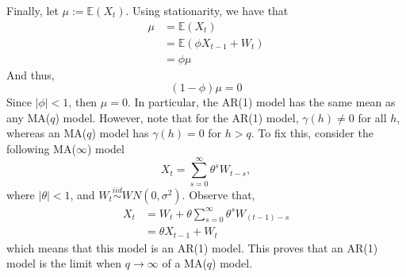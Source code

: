 \documentclass[11pt, english]{article}
\begin{document}
\begin{multicols}{2}
Finally, let $\mu := \mathbb{E}(X_{t})$. Using stationarity, we have that
	\begin{align*}
		\mu	&=	\mathbb{E}(X_{t})	\\
			&=	\mathbb{E}(\phi X_{t-1} + W_{t})	\\
			&=	\phi \mu
	\end{align*}
And thus,
	$$(1-\phi)\mu = 0$$
Since $|\phi| < 1$, then $\mu = 0$. In particular, the AR(1) model has the same mean as any MA($q$) model. However, note that for the AR(1) model, $\gamma(h)\neq 0$ for all $h$, whereas an MA($q$) model has $\gamma(h) = 0$ for $h > q$. To fix this, consider the following MA($\infty$) model
	$$X_{t} = \sum_{s=0}^{\infty} \theta^{s}W_{t-s},$$
where $|\theta| < 1$, and $W_{t} \overset{iid}{\sim} WN(0,\sigma^{2})$. Observe that,
	\begin{align*}
		X_{t}
			&=	W_{t} + \theta\sum_{s=0}^{\infty} \theta^{s} W_{(t-1)-s}	\\
			&=	\theta X_{t-1} + W_{t}
	\end{align*}
which means that this model is an AR(1) model. This proves that an AR(1) model is the limit when $q \to \infty$ of a MA($q$) model.


\end{multicols}
\end{document}
